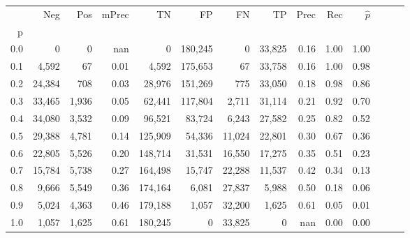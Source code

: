 \begin{tabular}{rrrrrrrrrrrrrr}
\toprule
{} &     Neg &    Pos & mPrec &       TN &       FP &      FN &      TP &  Prec &   Rec & $\hat{p}$ \\
p   &         &        &       &          &          &         &         &       &       &           \\
\midrule
0.0 &       0 &      0 &   nan &        0 &  180,245 &       0 &  33,825 &  0.16 &  1.00 &      1.00 \\
0.1 &   4,592 &     67 &  0.01 &    4,592 &  175,653 &      67 &  33,758 &  0.16 &  1.00 &      0.98 \\
0.2 &  24,384 &    708 &  0.03 &   28,976 &  151,269 &     775 &  33,050 &  0.18 &  0.98 &      0.86 \\
0.3 &  33,465 &  1,936 &  0.05 &   62,441 &  117,804 &   2,711 &  31,114 &  0.21 &  0.92 &      0.70 \\
0.4 &  34,080 &  3,532 &  0.09 &   96,521 &   83,724 &   6,243 &  27,582 &  0.25 &  0.82 &      0.52 \\
0.5 &  29,388 &  4,781 &  0.14 &  125,909 &   54,336 &  11,024 &  22,801 &  0.30 &  0.67 &      0.36 \\
0.6 &  22,805 &  5,526 &  0.20 &  148,714 &   31,531 &  16,550 &  17,275 &  0.35 &  0.51 &      0.23 \\
0.7 &  15,784 &  5,738 &  0.27 &  164,498 &   15,747 &  22,288 &  11,537 &  0.42 &  0.34 &      0.13 \\
0.8 &   9,666 &  5,549 &  0.36 &  174,164 &    6,081 &  27,837 &   5,988 &  0.50 &  0.18 &      0.06 \\
0.9 &   5,024 &  4,363 &  0.46 &  179,188 &    1,057 &  32,200 &   1,625 &  0.61 &  0.05 &      0.01 \\
1.0 &   1,057 &  1,625 &  0.61 &  180,245 &        0 &  33,825 &       0 &   nan &  0.00 &      0.00 \\
\bottomrule
\end{tabular}
